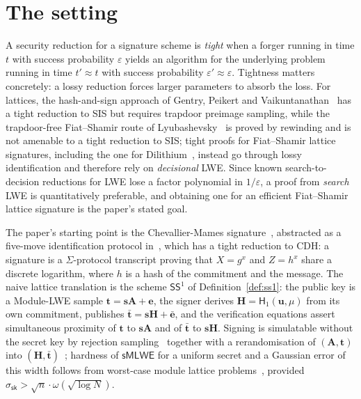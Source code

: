 \documentclass{aicr-conjecture}
\newcommand{\smlwe}{\mathsf{sMLWE}}
\newcommand{\SSone}{\mathsf{SS}^1}
\newcommand{\ssk}{\sigma_{\mathsf{sk}}}
\newcommand{\Hone}{\mathsf{H}_1}
\begin{document}
\section{The setting}\label{sec:setting}

A security reduction for a signature scheme is \emph{tight} when a
forger running in time $t$ with success probability $\varepsilon$
yields an algorithm for the underlying problem running in time
$t' \approx t$ with success probability $\varepsilon' \approx
\varepsilon$. Tightness matters concretely: a lossy reduction forces
larger parameters to absorb the loss. For lattices, the hash-and-sign
approach of Gentry, Peikert and Vaikuntanathan~\cite{GPV08} has a tight
reduction to SIS but requires trapdoor preimage sampling, while the
trapdoor-free Fiat--Shamir route of Lyubashevsky~\cite{Lyu12} is proved
by rewinding and is not amenable to a tight reduction to SIS; tight
proofs for Fiat--Shamir lattice signatures, including the one for
Dilithium~\cite{LDK22}, instead go through lossy identification and
therefore rely on \emph{decisional} LWE. Since known
search-to-decision reductions for LWE lose a factor polynomial in
$1/\varepsilon$, a proof from \emph{search} LWE is quantitatively
preferable, and obtaining one for an efficient Fiat--Shamir lattice
signature is the paper's stated goal.

The paper's starting point is the Chevallier-Mames
signature~\cite{Che05}, abstracted as a five-move identification
protocol in~\cite{KLP17}, which has a tight reduction to CDH: a
signature is a $\Sigma$-protocol transcript proving that $X = g^x$ and
$Z = h^x$ share a discrete logarithm, where $h$ is a hash of the
commitment and the message. The naive lattice translation is the scheme
$\SSone$ of Definition~\ref{def:ss1}: the public key is a Module-LWE
sample $\mathbf{t} = \mathbf{s}\mathbf{A} + \mathbf{e}$, the signer
derives $\mathbf{H} = \Hone(\mathbf{u},\mu)$ from its own commitment,
publishes $\bar{\mathbf{t}} = \mathbf{s}\mathbf{H} + \bar{\mathbf{e}}$,
and the verification equations assert simultaneous proximity of
$\mathbf{t}$ to $\mathbf{s}\mathbf{A}$ and of $\bar{\mathbf{t}}$ to
$\mathbf{s}\mathbf{H}$. Signing is simulatable without the secret key
by rejection sampling~\cite{Lyu12} together with a rerandomisation of
$(\mathbf{A},\mathbf{t})$ into
$(\mathbf{H},\bar{\mathbf{t}})$~\cite{GMPW20}; hardness of $\smlwe$ for
a uniform secret and a Gaussian error of this width follows from
worst-case module lattice problems~\cite{LS15}, provided
$\ssk > \sqrt{n}\cdot\omega(\sqrt{\log N})$.
\end{document}

